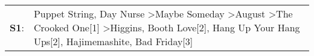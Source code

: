 \begin{supertabular}{p{0.03\textwidth}p{0.92\textwidth}}
 \textbf{S1}:  &  Puppet String\textsuperscript{}, \enspace Day Nurse\textsuperscript{} \textgreater \enspace Maybe Someday\textsuperscript{} \textgreater \enspace August\textsuperscript{} \textgreater \enspace The Crooked One[1]\textsuperscript{} \textgreater \enspace Higgins\textsuperscript{}, \enspace Booth Love[2]\textsuperscript{}, \enspace Hang Up Your Hang Ups[2]\textsuperscript{}, \enspace Hajimemashite\textsuperscript{}, \enspace Bad Friday[3]\textsuperscript{}  \enspace  \\
\end{supertabular}
